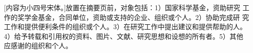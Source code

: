 \begin{thanks}

	[内容为小四号宋体。]放置在摘要页前，对象包括：1）国家科学基金，资助研究 工作的奖学金基金，合同单位，资助或支持的企业、组织或个人。2）协助完成研 究工作和提供便利条件的组织或个人。3）在研究工作中提出建议和提供帮助的人。 4）给予转载和引用权的资料、图片、文献、研究思想和设想的所有者。5）其他 应感谢的组织和个人。

\end{thanks}
